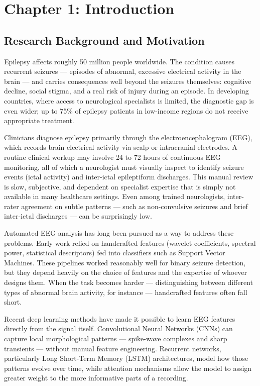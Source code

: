 \section*{Chapter 1: Introduction}
\setcounter{section}{1} \setcounter{subsection}{0}
 {}

\subsection{Research Background and Motivation}

Epilepsy affects roughly 50 million people worldwide. The condition causes recurrent seizures --- episodes of abnormal, excessive electrical activity in the brain --- and carries consequences well beyond the seizures themselves: cognitive decline, social stigma, and a real risk of injury during an episode. In developing countries, where access to neurological specialists is limited, the diagnostic gap is even wider; up to 75\% of epilepsy patients in low-income regions do not receive appropriate treatment.

Clinicians diagnose epilepsy primarily through the electroencephalogram (EEG), which records brain electrical activity via scalp or intracranial electrodes. A routine clinical workup may involve 24 to 72 hours of continuous EEG monitoring, all of which a neurologist must visually inspect to identify seizure events (ictal activity) and inter-ictal epileptiform discharges. This manual review is slow, subjective, and dependent on specialist expertise that is simply not available in many healthcare settings. Even among trained neurologists, inter-rater agreement on subtle patterns --- such as non-convulsive seizures and brief inter-ictal discharges --- can be surprisingly low.

Automated EEG analysis has long been pursued as a way to address these problems. Early work relied on handcrafted features (wavelet coefficients, spectral power, statistical descriptors) fed into classifiers such as Support Vector Machines. These pipelines worked reasonably well for binary seizure detection, but they depend heavily on the choice of features and the expertise of whoever designs them. When the task becomes harder --- distinguishing between different types of abnormal brain activity, for instance --- handcrafted features often fall short.

Recent deep learning methods have made it possible to learn EEG features directly from the signal itself. Convolutional Neural Networks (CNNs) can capture local morphological patterns --- spike-wave complexes and sharp transients --- without manual feature engineering. Recurrent networks, particularly Long Short-Term Memory (LSTM) architectures, model how those patterns evolve over time, while attention mechanisms allow the model to assign greater weight to the more informative parts of a recording.

